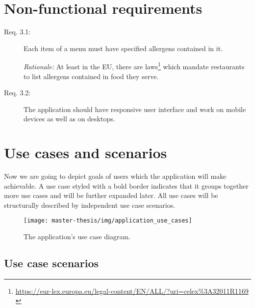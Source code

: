 \section{Non-functional requirements}
\begin{description}
    \item [Req. 3.1:] Each item of a menu must have specified allergens contained in it.
    
    \emph{Rationale:} At least in the EU, there are laws\footnote{\url{https://eur-lex.europa.eu/legal-content/EN/ALL/?uri=celex\%3A32011R1169}  \label{fnlabel}} which mandate restaurants to list allergens contained in food they serve.
    \item [Req. 3.2:] The application should have responsive user interface and work on mobile devices as well as on desktops.
\end{description}

\section{Use cases and scenarios}
Now we are going to depict goals of users which the application will make achievable.
A use case styled with a bold border indicates that it groups together more use cases and will be further expanded later.
All use cases will be structurally described by independent use case scenarios.

\begin{figure}
    \centering 
    \texttt{[image: master-thesis/img/application\_use\_cases]}
    \caption{The application's use case diagram.}
\end{figure}



\subsection{Use case scenarios}
